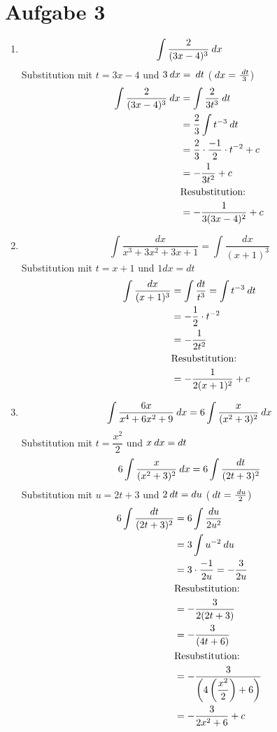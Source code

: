 \documentclass[
    10pt,
    parskip=half-,
    paper=a4,
    english,ngerman,
    fleqn,
]{scrartcl}
\begin{document}
\section*{Aufgabe 3}
\begin{enumerate}
\item \[ \int \dfrac{2}{(3x-4)^3} \> dx \]
    Substitution mit $t = 3x-4$ und $3\> dx = \> dt$ ($\> dx = \frac{\> dt}{3}$)
    \begin{align*}
        \int \dfrac{2}{(3x-4)^3} \> dx
        &= \int \dfrac{2}{3t^3} \> dt \\
        &= \dfrac{2}{3} \int t^{-3} \> dt\\
        &= \dfrac{2}{3} \cdot \dfrac{-1}{2} \cdot t^{-2} + c\\
        &= - \dfrac{1}{3t^2} + c\\
        &\text{Resubstitution:}\\
        &= - \dfrac{1}{3(3x-4)^2} + c
    \end{align*}
\item \[ \int \dfrac{dx}{x^3 + 3x^2 + 3x + 1} = \int \dfrac{dx}{(x+1)^3}\]
    Substitution mit $t = x+1$ und $1dx = dt$
    \begin{align*}
        \int \dfrac{dx}{(x+1)^3}
        &= \int \dfrac{dt}{t^3} = \int t^{-3} \> dt\\
        &= -\dfrac{1}{2} \cdot t^{-2}\\
        &= -\dfrac{1}{2t^2}\\
        &\text{Resubstitution:}\\
        &= -\dfrac{1}{2(x+1)^2} + c\\
    \end{align*}
\item \[ \int \dfrac{6x}{x^4+6x^2+9} \> dx = 6 \int \dfrac{x}{(x^2+3)^2} \> dx\]
    Substitution mit $t = \dfrac{x^2}{2}$ und $x\> dx = dt$
    \[ 6 \int \dfrac{x}{(x^2+3)^2}\> dx = 6 \int \dfrac{dt}{(2t+3)^2} \]
    Substitution mit $u = 2t+3$ und $2\> dt = du$ ($\> dt = \frac{\> du}{2}$)
        \begin{align*}
            6 \int \dfrac{dt}{(2t+3)^2}
            &= 6 \int \dfrac{du}{2u^2}\\
            &= 3 \int u^{-2} \> du\\
            &= 3 \cdot \dfrac{-1}{2u} = -\dfrac{3}{2u}\\
            &\text{Resubstitution:}\\
            &= -\dfrac{3}{2(2t+3)}\\
            &= -\dfrac{3}{(4t+6)}\\
            &\text{Resubstitution:}\\
            &= -\dfrac{3}{\left(4\left(\dfrac{x^2}{2}\right)+6\right)}\\
            &= -\dfrac{3}{2x^2+6} + c\\
        \end{align*}
\end{enumerate}



\end{document}
